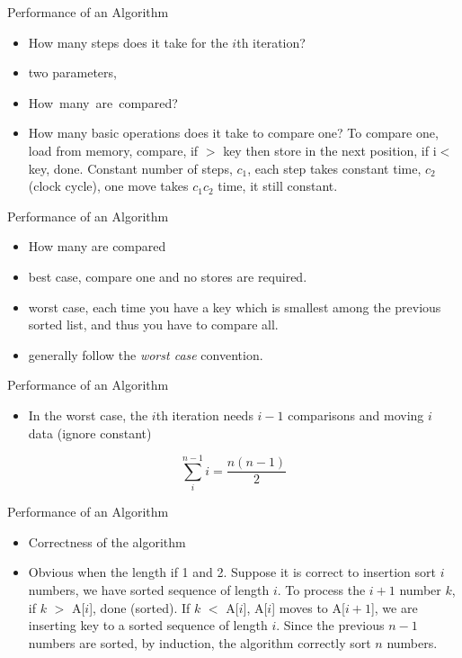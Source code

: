 \documentclass{beamer}
\begin{document}
\begin{frame}{}
\begin{center}
Performance of an Algorithm
\end{center}
\begin{itemize}
\item How many steps does it take for the $i$th iteration?
\item two parameters, 
\item {\rm How\ many\ are\ compared?}
\item {\small How many basic operations does it take
 to compare one?  To compare one, load from memory, compare, if $>$ key then
 store in the next position, if i$<$ key, done. 
 Constant number of steps, $c_1$,
 each step takes constant time, $c_2$ (clock cycle), one move takes $c_1c_2$
 time, it still constant.  }
\end{itemize}
\end{frame}

\begin{frame}{}
\begin{center}
Performance of an Algorithm
\end{center}
\begin{itemize}
\item How many are compared
\item best case, compare one and no stores are required.
\item worst case, each time you have a key which is smallest among the previous
 sorted list, and thus you have to compare all.  
\item generally follow the {\it worst case} convention.
\end{itemize}
\end{frame}

\begin{frame}{}
\begin{center}
Performance of an Algorithm
\end{center}
\begin{itemize}
\item In the worst case, the $i$th iteration needs $i-1$ comparisons and
 moving $i$ data (ignore constant)
\end{itemize}
$$ \sum_i^{n-1}i = \frac{n(n-1)}{2}$$
\end{frame}

\begin{frame}{}
\begin{center}
Performance of an Algorithm
\end{center}
\begin{itemize}
\item Correctness of the algorithm
\item { Obvious when the length if 1 and 2.  Suppose it is correct
 to insertion sort $i$ numbers, we have sorted sequence of length $i$.  
 To process the $i+1$ number $k$, if $k$ $>$ A[$i$], done (sorted).  
 If $k$ $<$ A[$i$], A[$i$] moves to A[$i+1$], we are inserting key to a sorted
 sequence of length $i$.  Since the previous $n-1$ numbers are sorted,
by induction, the algorithm correctly sort $n$ numbers. }
\end{itemize}
\end{frame}
\end{document}
